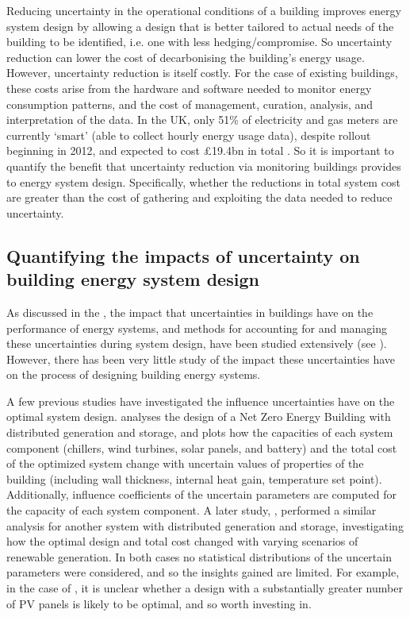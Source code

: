 Reducing uncertainty in the operational conditions of a building improves energy system design by allowing a design that is better tailored to actual needs of the building to be identified, i.e. one with less hedging/compromise. So uncertainty reduction can lower the cost of decarbonising the building's energy usage.
However, uncertainty reduction is itself costly. For the case of existing buildings, these costs arise from the hardware and software needed to monitor energy consumption patterns, and the cost of management, curation, analysis, and interpretation of the data.
In the UK, only 51\% of electricity and gas meters are currently `smart' (able to collect hourly energy usage data), despite rollout beginning in 2012, and expected to cost £19.4bn in total \citep{desnz2023UpdateRolloutSmart}.
So it is important to quantify the benefit that uncertainty reduction via monitoring buildings provides to energy system design. Specifically, whether the reductions in total system cost are greater than the cost of gathering and exploiting the data needed to reduce uncertainty.


\subsection{Quantifying the impacts of uncertainty on building energy system design}

As discussed in the , the impact that uncertainties in buildings have on the performance of energy systems, and methods for accounting for and managing these uncertainties during system design, have been studied extensively (see ).
However, there has been very little study of the impact these uncertainties have on the process of designing building energy systems.

A few previous studies have investigated the influence uncertainties have on the optimal system design.
\citep{sun2015SensitivityAnalysisMacroparameters} analyses the design of a Net Zero Energy Building with distributed generation and storage, and plots how the capacities of each system component (chillers, wind turbines, solar panels, and battery) and the total cost of the optimized system change with uncertain values of properties of the building (including wall thickness, internal heat gain, temperature set point). Additionally, influence coefficients of the uncertain parameters are computed for the capacity of each system component. A later study, \citep{sanajaobasingh2018ModelingSizeOptimization}, performed a similar analysis for another system with distributed generation and storage, investigating how the optimal design and total cost changed with varying scenarios of renewable generation. In both cases no statistical distributions of the uncertain parameters were considered, and so the insights gained are limited. For example, in the case of \citep{sanajaobasingh2018ModelingSizeOptimization}, it is unclear whether a design with a substantially greater number of PV panels is likely to be optimal, and so worth investing in.

